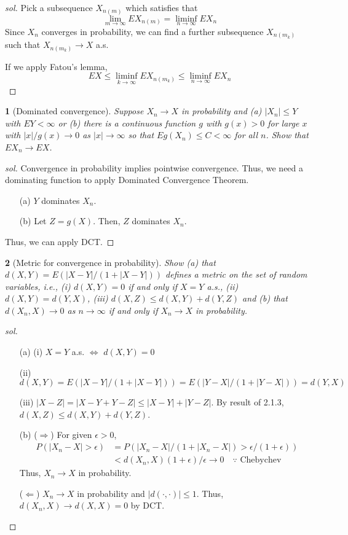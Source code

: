 \documentclass{report}
\newtheorem{ex}{}[section]
\begin{document}
\begin{proof}[sol]
Pick a subsequence $X_{n(m)}$ which satisfies that
\[\lim_{m\to\infty} EX_{n(m)} = \liminf_{n\to\infty} EX_n \]
Since $X_n$ converges in probability, we can find a further subsequence $X_{n(m_k)}$ such that $X_{n(m_k)} \to X$ a.s.

If we apply Fatou's lemma,
\[EX \le \liminf_{k\to\infty} EX_{n(m_k)} \le \liminf_{n\to\infty} EX_n\]

\end{proof}
\begin{ex}[Dominated convergence]
Suppose $X_n \to X$ in probability and (a) $|X_n| \le Y$ with $EY < \infty $ or (b) there is a continuous function $g$ with $g(x) > 0$ for large $x$ with $|x|/g(x) \to 0$ as $|x| \to \infty$ so that $Eg(X_n) \le C < \infty $ for all $n$. Show that $EX_n \to EX$.
\end{ex}
\begin{proof}[sol]
Convergence in probability implies pointwise convergence. Thus, we need a dominating function to apply Dominated Convergence Theorem.
\begin{enumerate}
	\item[(a)] $Y$ dominates $X_n$.
	\item[(b)] Let $Z = g(X)$. Then, $Z$ dominates $X_n$.
\end{enumerate}
Thus, we can apply DCT.
\end{proof}
\begin{ex}[Metric for convergence in probability]
Show (a) that $d(X,Y) = E(|X-Y|/(1+|X-Y|))$ defines a metric on the set of random variables, i.e., (i) $d(X,Y) = 0$ if and only if $X = Y$ a.s., (ii) $d(X,Y) = d(Y,X)$, (iii) $d(X,Z) \le d(X,Y) + d(Y,Z)$ and (b) that $d(X_n, X) \to 0$ as $n \to \infty$ if and only if $X_n \to X$ in probability.
\end{ex}
\begin{proof}[sol]~
\begin{enumerate}
\item[(a)] 
(i) $X = Y$ a.s. $\Leftrightarrow$ $d(X,Y) = 0$

(ii) $d(X,Y) = E(|X-Y|/(1+|X-Y|)) =  E(|Y-X|/(1+|Y-X|)) = d(Y,X)$

(iii) $|X-Z| = |X -Y + Y -Z| \le |X-Y| + |Y -Z|$. By result of 2.1.3, $d(X,Z) \le d(X,Y) + d(Y,Z)$.

\item[(b)]
($\Rightarrow$)
For given $\epsilon > 0$,
\begin{align*}
P(|X_n - X| > \epsilon) &= P(|X_n-X|/(1+|X_n-X|) > \epsilon/(1+\epsilon))\\
 &< d(X_n,X) (1+\epsilon)/\epsilon \to 0 \quad \because \text{ Chebychev}
\end{align*}
Thus, $X_n \to X$ in probability.

($\Leftarrow$)
$X_n \to X$ in probability and $|d(\cdot, \cdot)| \le 1 $. Thus, $d(X_n,X) \to d(X,X) = 0$ by DCT.
\end{enumerate}
\end{proof}
\end{document}
